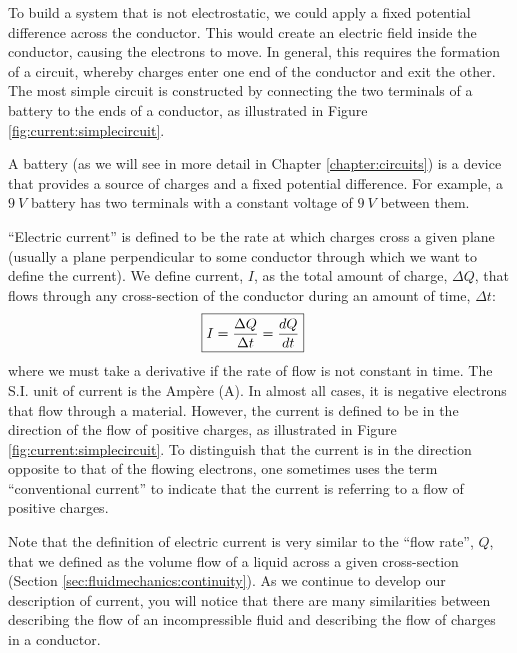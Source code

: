 To build a system that is not electrostatic, we could apply a fixed potential difference across the conductor. This would create an  electric field inside the conductor, causing the electrons to move. In general, this requires the formation of a circuit, whereby charges enter one end of the conductor and exit the other. The most simple circuit is constructed by connecting the two terminals of a battery to the ends of a conductor, as illustrated in Figure \ref{fig:current:simplecircuit}. 


A battery (as we will see in more detail in Chapter \ref{chapter:circuits}) is a device that provides a source of charges and a fixed potential difference. For example, a $\SI{9}{V}$ battery has two terminals with a constant voltage of $\SI{9}{V}$ between them.


``Electric current'' is defined to be the rate at which charges cross a given plane (usually a plane perpendicular to some conductor through which we want to define the current). We define current, $I$, as the total amount of charge, $\Delta Q$, that flows through any cross-section of the conductor during an amount of time, $\Delta t$:
\begin{align*}
\Aboxed{I=\frac{\Delta Q}{\Delta t}=\frac{dQ}{dt}}
\end{align*}
where we must take a derivative if the rate of flow is not constant in time. The S.I. unit of current is the Amp\`ere (\si{A}). In almost all cases, it is negative electrons that flow through a material. However, the current is defined to be in the direction of the flow of positive charges, as illustrated in Figure \ref{fig:current:simplecircuit}. To distinguish that the current is in the direction opposite to that of the flowing electrons, one sometimes uses the term ``conventional current'' to indicate that the current is referring to a flow of positive charges.

Note that the definition of electric current is very similar to the ``flow rate'', $Q$, that we defined as the volume flow of a liquid across a given cross-section (Section \ref{sec:fluidmechanics:continuity}). As we continue to develop our description of current, you will notice that there are many similarities between describing the flow of an incompressible fluid and describing the flow of charges in a conductor.

